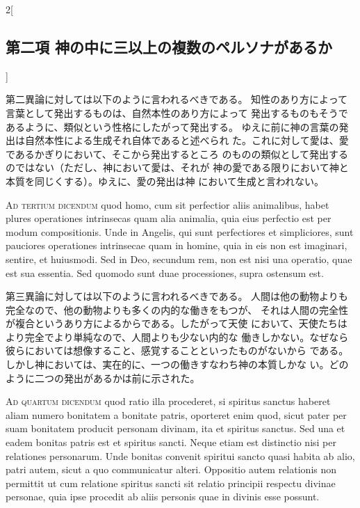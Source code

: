 \documentclass[paper=a4paper,fontsize=10pt,jafontsize=9pt,titlepage]{jlreq}
\begin{document}
\begin{paracol}{2}[\subsection{第二項 神の中に三以上の複数のペルソナがあるか}]
\switchcolumn


第二異論に対しては以下のように言われるべきである。
知性のあり方によって言葉として発出するものは、自然本性のあり方によって
 発出するものもそうであるように、類似という性格にしたがって発出する。
 ゆえに前に神の言葉の発出は自然本性による生成それ自体であると述べられ
 た。これに対して愛は、愛であるかぎりにおいて、そこから発出するところ
 のものの類似として発出するのではない（ただし、神において愛は、それが
 神の愛である限りにおいて神と本質を同じくする）。ゆえに、愛の発出は神
 において生成と言われない。


\switchcolumn*[\subsection{ad.3}]


{\scshape Ad tertium dicendum} quod homo, cum sit perfectior aliis animalibus,
habet plures operationes intrinsecas quam alia animalia, quia eius
perfectio est per modum compositionis. Unde in Angelis, qui sunt
perfectiores et simpliciores, sunt pauciores operationes intrinsecae
quam in homine, quia in eis non est imaginari, sentire, et
huiusmodi. Sed in Deo, secundum rem, non est nisi una operatio, quae
est sua essentia. Sed quomodo sunt duae processiones, supra ostensum
est.


\switchcolumn


第三異論に対しては以下のように言われるべきである。
人間は他の動物よりも完全なので、他の動物よりも多くの内的な働きをもつが、
 それは人間の完全性が複合というあり方によるからである。したがって天使
 において、天使たちはより完全でより単純なので、人間よりも少ない内的な
 働きしかない。なぜなら彼らにおいては想像すること、感覚することといったものがないから
 である。しかし神においては、実在的に、一つの働きすなわち神の本質しかな
 い。どのように二つの発出があるかは前に示された。


\switchcolumn*[\subsection{ad.4}]


{\scshape Ad quartum dicendum} quod ratio illa procederet, si spiritus sanctus
haberet aliam numero bonitatem a bonitate patris, oporteret enim quod,
sicut pater per suam bonitatem producit personam divinam, ita et
spiritus sanctus. Sed una et eadem bonitas patris est et spiritus
sancti. Neque etiam est distinctio nisi per relationes
personarum. Unde bonitas convenit spiritui sancto quasi habita ab
alio, patri autem, sicut a quo communicatur alteri. Oppositio autem
relationis non permittit ut cum relatione spiritus sancti sit relatio
principii respectu divinae personae, quia ipse procedit ab aliis
personis quae in divinis esse possunt.



\end{paracol}
\end{document}
